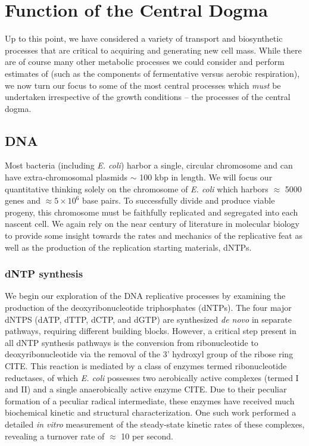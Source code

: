 \section{Function of the Central Dogma}
Up to this point, we have considered a variety of transport and biosynthetic
processes that are critical to acquiring and generating new cell mass. While
there are of course many other metabolic processes we could consider and
perform estimates of (such as the components of fermentative versus aerobic
respiration), we now turn our focus to some of the most central processes
which \textit{must} be undertaken irrespective of the growth conditions --
the processes of the central dogma.


\subsection{DNA}
Most bacteria (including \textit{E. coli}) harbor a single,
circular chromosome and can have extra-chromosomal plasmids $\sim$ 100 kbp in
length. We will focus our quantitative thinking solely on the chromosome of
\textit{E. coli} which harbors $\approx$ 5000 genes and $\approx 5\times
10^6$ base pairs. To successfully divide and produce viable progeny, this chromosome must be faithfully replicated and
segregated into each nascent cell. We again rely on the near century of literature in molecular biology to provide some insight
towards the rates and mechanics of the replicative feat as well as the
production of the replication starting materials, dNTPs.

\subsubsection{dNTP synthesis}
We begin our exploration of the DNA replicative processes by examining the
production of the deoxyribonucleotide triphosphates (dNTPs). The four major
dNTPS (dATP, dTTP, dCTP, and dGTP) are synthesized \textit{de novo} in separate
pathways, requiring different building blocks. However, a critical step present
in all dNTP synthesis pathways is the conversion from ribonucleotide to
deoxyribonucleotide via the removal of the 3' hydroxyl group of the ribose ring
CITE. This reaction is mediated by a class of enzymes termed ribonucleotide
reductases, of which \textit{E. coli} possesses two aerobically active complexes
(termed I and II) and a single anaerobically active enzyme CITE. Due to their
peculiar formation of a peculiar radical intermediate, these enzymes have
received much biochemical kinetic and structural characterization.  One such
work \citep{ge2003} performed a detailed \textit{in vitro} measurement of the
steady-state kinetic rates of these complexes, revealing a turnover rate of
$\approx$ 10 per second.

